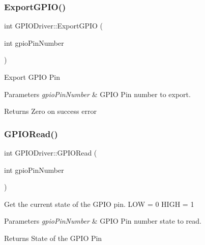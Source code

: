 \subsubsection{\texorpdfstring{Export\+G\+P\+I\+O()}{ExportGPIO()}}
{\footnotesize\ttfamily int G\+P\+I\+O\+Driver\+::\+Export\+G\+P\+IO (\begin{DoxyParamCaption}\item[{int}]{gpio\+Pin\+Number }\end{DoxyParamCaption})\hspace{0.3cm}{\ttfamily [private]}}

Export G\+P\+IO Pin


\begin{DoxyParams}{Parameters}
{\em gpio\+Pin\+Number} & G\+P\+IO Pin number to export.\\
\hline
\end{DoxyParams}
\begin{DoxyReturn}{Returns}
Zero on success error 
\end{DoxyReturn}
\mbox{\label{classGPIODriver_a68be60ab1fb0e9c29f60818654766a32}} 
\subsubsection{\texorpdfstring{G\+P\+I\+O\+Read()}{GPIORead()}}
{\footnotesize\ttfamily int G\+P\+I\+O\+Driver\+::\+G\+P\+I\+O\+Read (\begin{DoxyParamCaption}\item[{int}]{gpio\+Pin\+Number }\end{DoxyParamCaption})}

Get the current state of the G\+P\+IO pin. L\+OW = 0 H\+I\+GH = 1


\begin{DoxyParams}{Parameters}
{\em gpio\+Pin\+Number} & G\+P\+IO Pin number state to read.\\
\hline
\end{DoxyParams}
\begin{DoxyReturn}{Returns}
State of the G\+P\+IO Pin 
\end{DoxyReturn}
\mbox{\label{classGPIODriver_a9e694366a04bc8662865ea758a74eabe}} 
